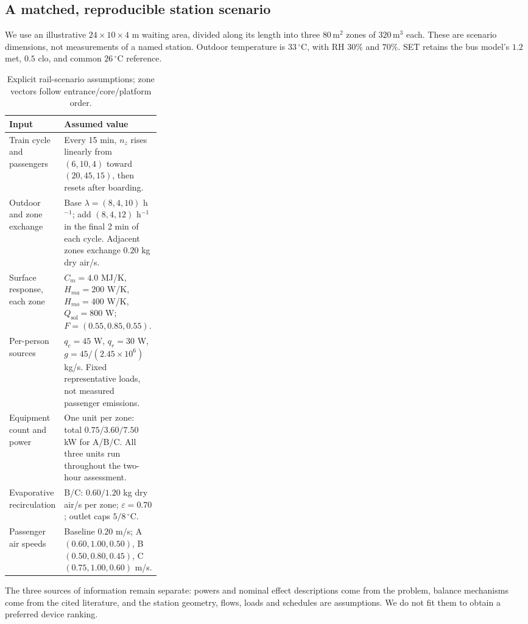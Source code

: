 \subsection{A matched, reproducible station scenario}

We use an illustrative $24\times10\times4$ m waiting area, divided along its length into three $80\,\mathrm{m^2}$ zones of $320\,\mathrm{m^3}$ each. These are scenario dimensions, not measurements of a named station. Outdoor temperature is $33\,^{\circ}\mathrm C$, with RH $30\%$ and $70\%$. SET retains the bus model's $1.2$ met, $0.5$ clo, and common $26\,^{\circ}\mathrm C$ reference.

\begin{table}[!ht]
\centering\small
\caption{Explicit rail-scenario assumptions; zone vectors follow entrance/core/platform order.}
\label{tab:rail-inputs}
\begin{tabularx}{\linewidth}{@{}>{\raggedright\arraybackslash}p{0.29\linewidth}>{\raggedright\arraybackslash}X@{}}
\toprule
Input & Assumed value\\
\midrule
Train cycle and passengers & Every 15 min, $n_z$ rises linearly from $(6,10,4)$ toward $(20,45,15)$, then resets after boarding.\\
Outdoor and zone exchange & Base $\lambda=(8,4,10)$ h$^{-1}$; add $(8,4,12)$ h$^{-1}$ in the final 2 min of each cycle. Adjacent zones exchange $0.20$ kg dry air/s.\\
Surface response, each zone & $C_m=4.0$ MJ/K, $H_{ma}=200$ W/K, $H_{mo}=400$ W/K, $Q_{\mathrm{sol}}=800$ W; $F=(0.55,0.85,0.55)$.\\
Per-person sources & $q_c=45$ W, $q_r=30$ W, $g=45/(2.45\times10^6)$ kg/s. Fixed representative loads, not measured passenger emissions.\\
Equipment count and power & One unit per zone: total $0.75/3.60/7.50$ kW for A/B/C. All three units run throughout the two-hour assessment.\\
Evaporative recirculation & B/C: $0.60/1.20$ kg dry air/s per zone; $\varepsilon=0.70$; outlet caps $5/8\,^{\circ}\mathrm C$.\\
Passenger air speeds & Baseline $0.20$ m/s; A $(0.60,1.00,0.50)$, B $(0.50,0.80,0.45)$, C $(0.75,1.00,0.60)$ m/s.\\
\bottomrule
\end{tabularx}
\end{table}

The three sources of information remain separate: powers and nominal effect descriptions come from the problem, balance mechanisms come from the cited literature, and the station geometry, flows, loads and schedules are assumptions. We do not fit them to obtain a preferred device ranking.

